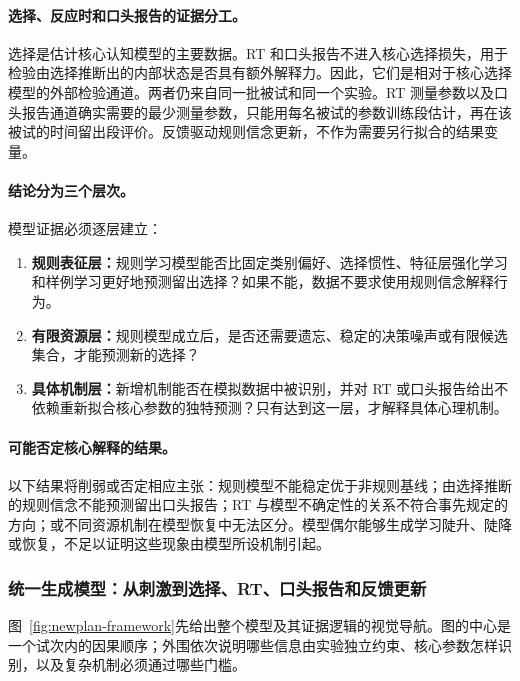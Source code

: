 \paragraph{选择、反应时和口头报告的证据分工。}
选择是估计核心认知模型的主要数据。RT 和口头报告不进入核心选择损失，用于检验由选择推断出的内部状态是否具有额外解释力。因此，它们是相对于核心选择模型的外部检验通道。两者仍来自同一批被试和同一个实验。RT 测量参数以及口头报告通道确实需要的最少测量参数，只能用每名被试的参数训练段估计，再在该被试的时间留出段评价。反馈驱动规则信念更新，不作为需要另行拟合的结果变量。

\paragraph{结论分为三个层次。}
模型证据必须逐层建立：
\begin{enumerate}
    \item \textbf{规则表征层：}规则学习模型能否比固定类别偏好、选择惯性、特征层强化学习和样例学习更好地预测留出选择？如果不能，数据不要求使用规则信念解释行为。
    \item \textbf{有限资源层：}规则模型成立后，是否还需要遗忘、稳定的决策噪声或有限候选集合，才能预测新的选择？
    \item \textbf{具体机制层：}新增机制能否在模拟数据中被识别，并对 RT 或口头报告给出不依赖重新拟合核心参数的独特预测？只有达到这一层，才解释具体心理机制。
\end{enumerate}

\paragraph{可能否定核心解释的结果。}
以下结果将削弱或否定相应主张：规则模型不能稳定优于非规则基线；由选择推断的规则信念不能预测留出口头报告；RT 与模型不确定性的关系不符合事先规定的方向；或不同资源机制在模型恢复中无法区分。模型偶尔能够生成学习陡升、陡降或恢复，不足以证明这些现象由模型所设机制引起。


\subsubsection{统一生成模型：从刺激到选择、RT、口头报告和反馈更新}

图~\ref{fig:newplan-framework}先给出整个模型及其证据逻辑的视觉导航。图的中心是一个试次内的因果顺序；外围依次说明哪些信息由实验独立约束、核心参数怎样识别，以及复杂机制必须通过哪些门槛。

